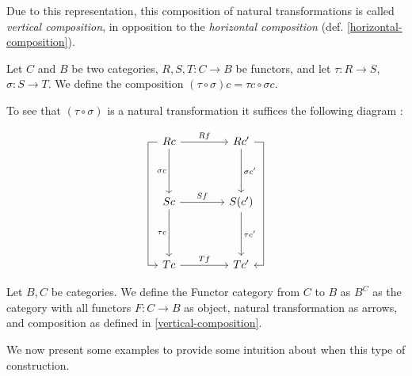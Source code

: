 Due to this representation, this composition of natural transformations is called \emph{vertical composition}, in opposition to the \emph{horizontal composition} (def. \ref{horizontal-composition}).

\begin{definition}\label{vertical-composition}
  Let $C$ and $B$ be two categories, $R,S,T : C \to B$ be functors, and let $\tau: R \to S$, $\sigma:S\to T$. We define the composition $(\tau \circ \sigma)c = \tau c\circ \sigma c$.
\end{definition}

To see that $(\tau \circ \sigma)$ is a natural transformation it suffices the following diagram \cite{stack-composition-natural}:

\[
\begin{tikzcd}[row sep = 1.4cm, column sep = 1.4cm]
  R c
  \arrow[lddr, to path= { --
    ([xshift=-1ex]\tikztostart.west)
    -| ([xshift=-2ex]\tikztotarget.west)
    |- (\tikztotarget)}]
  \arrow[d, swap, "\sigma c"]
  \arrow[r, "R f"] 
  & R c'
  \arrow[d, "\sigma c'"]
  \arrow[rddl, to path= { --
    ([xshift=1ex]\tikztostart.east) 
    -| ([xshift=2ex]\tikztotarget.east)
    -- (\tikztotarget)}, "\sigma \circ \tau c'"]
  \\
  S c
  \arrow[d, swap, "\tau c "] 
  \arrow[r, "S f "] & S(c')
  \arrow[d, "\tau c'"] \\
  T c 
  \arrow[r, "T f"] & T c'
\end{tikzcd}
\]



\begin{definition}
  Let $B,C$ be categories. We define the Functor category from $C$ to $B$ as $B^C$ as  the category with all functors $F:C \to B$ as object, natural transformation as arrows, and composition as defined in \ref{vertical-composition}.
\end{definition}


We now present some examples to provide some intuition about when this type of construction.

